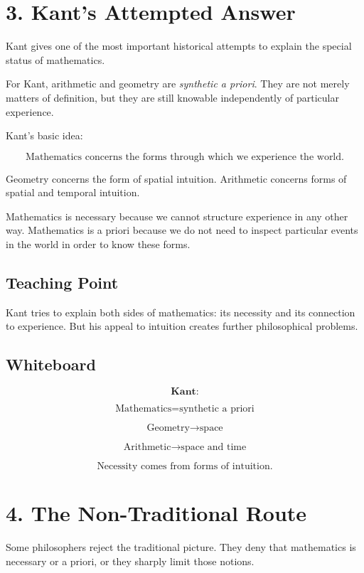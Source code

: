 \documentclass[11pt]{article}
\begin{document}
\section*{3. Kant's Attempted Answer}

Kant gives one of the most important historical attempts to explain the special status of
mathematics.

For Kant, arithmetic and geometry are \emph{synthetic a priori}. They are not merely matters
of definition, but they are still knowable independently of particular experience.

Kant's basic idea:

\[
\text{Mathematics concerns the forms through which we experience the world.}
\]

Geometry concerns the form of spatial intuition. Arithmetic concerns forms of spatial and
temporal intuition.

Mathematics is necessary because we cannot structure experience in any other way.
Mathematics is a priori because we do not need to inspect particular events in the world in
order to know these forms.

\subsection*{Teaching Point}

Kant tries to explain both sides of mathematics: its necessity and its connection to
experience. But his appeal to intuition creates further philosophical problems.

\subsection*{Whiteboard}

\[
\textbf{Kant:}
\]

\[
\text{Mathematics} = \text{synthetic a priori}
\]

\[
\text{Geometry} \rightarrow \text{space}
\]

\[
\text{Arithmetic} \rightarrow \text{space and time}
\]

\[
\text{Necessity comes from forms of intuition.}
\]

\section*{4. The Non-Traditional Route}

Some philosophers reject the traditional picture. They deny that mathematics is necessary
or a priori, or they sharply limit those notions.
\end{document}
